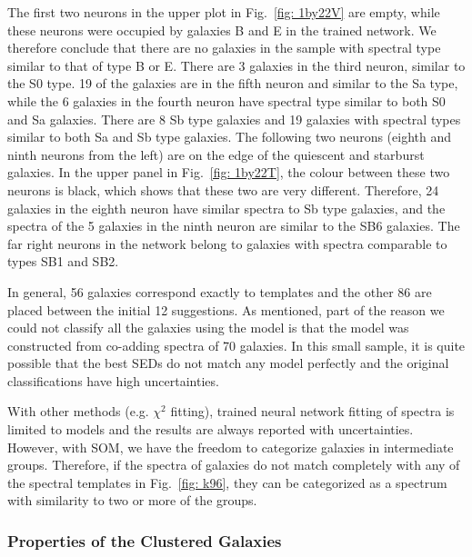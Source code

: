             The first two neurons in the upper plot in Fig.~\ref{fig: 1by22V} are empty, while these neurons were occupied by galaxies B and E in the trained network.
            We therefore conclude that there are no galaxies in the  sample with spectral type similar to that of type B or E.
            There are 3 galaxies in the third neuron, similar to the S0 type. 
            19 of the galaxies are in the fifth neuron and similar to the Sa type, while the 6 galaxies in the fourth neuron have spectral type similar to both S0 and Sa galaxies.
            There are 8 Sb type galaxies and 19 galaxies with spectral types similar to both Sa and Sb type galaxies.
            The following two neurons (eighth and ninth neurons from the left) are on the edge of the quiescent and starburst galaxies.
            In the upper panel in Fig.~\ref{fig: 1by22T}, the colour between these two neurons is black, which shows that these two are very different.
            Therefore, 24 galaxies in the eighth neuron have similar spectra to Sb type galaxies, and the spectra of the 5 galaxies in the ninth neuron are similar to the SB6 galaxies.
            The far right neurons in the network belong to galaxies with spectra comparable to types SB1 and SB2.
            
            In general, 56 galaxies correspond exactly to  templates and the other 86 are placed between the initial 12 suggestions.
            As  mentioned, part of the reason we could not classify all the galaxies using the  model is that the model was constructed from co-adding spectra of 70 galaxies.
            In this small sample, it is quite possible that the best SEDs do not match any model perfectly and the original classifications have high uncertainties.
            
            With other methods (e.g. $\chi^2$ fitting), trained neural network fitting of spectra is limited to models and the results are always reported with uncertainties.
            However, with SOM, we have the freedom to categorize galaxies in intermediate groups.
            Therefore, if the spectra of galaxies do not match completely with any of the spectral templates in Fig.~\ref{fig: k96}, they can be categorized as a spectrum with similarity to two or more of the groups.

                        
        
        
        \subsubsection{Properties of the Clustered Galaxies}
        
